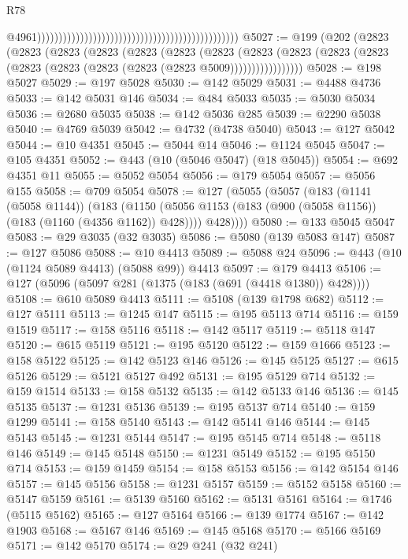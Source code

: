 \begin{lexlean}{R78}
\begin{coremodule}
                                                                                                  @4961)))))))))))))))))))))))))))))))))))))))))))))))
@5027 := @199
    (@202
      (@2823
        (@2823
          (@2823
            (@2823
              (@2823
                (@2823
                  (@2823
                    (@2823
                      (@2823 (@2823 (@2823 (@2823 (@2823 (@2823 (@2823 (@2823 @5009)))))))))))))))))
@5028 := @198 @5027
@5029 := @197 @5028
@5030 := @142 @5029
@5031 := @4488 @4736
@5033 := @142 @5031 @146
@5034 := @484 @5033
@5035 := @5030 @5034
@5036 := @2680 @5035
@5038 := @142 @5036 @285
@5039 := @2290 @5038
@5040 := @4769 @5039
@5042 := @4732 (@4738 @5040)
@5043 := @127 @5042
@5044 := @10 @4351
@5045 := @5044 @14
@5046 := @1124 @5045
@5047 := @105 @4351
@5052 := @443 (@10 (@5046 @5047) (@18 @5045))
@5054 := @692 @4351 @11
@5055 := @5052 @5054
@5056 := @179 @5054
@5057 := @5056 @155
@5058 := @709 @5054
@5078 := @127
    (@5055
      (@5057
        (@183
          (@1141 (@5058 @1144))
          (@183
            (@1150 (@5056 @1153 (@183 (@900 (@5058 @1156)) (@183 (@1160 (@4356 @1162)) @428))))
            @428))))
@5080 := @133 @5045 @5047
@5083 := @29 @3035 (@32 @3035)
@5086 := @5080 (@139 @5083 @147)
@5087 := @127 @5086
@5088 := @10 @4413
@5089 := @5088 @24
@5096 := @443 (@10 (@1124 @5089 @4413) (@5088 @99)) @4413
@5097 := @179 @4413
@5106 := @127 (@5096 (@5097 @281 (@1375 (@183 (@691 (@4418 @1380)) @428))))
@5108 := @610 @5089 @4413
@5111 := @5108 (@139 @1798 @682)
@5112 := @127 @5111
@5113 := @1245 @147
@5115 := @195 @5113 @714
@5116 := @159 @1519
@5117 := @158 @5116
@5118 := @142 @5117
@5119 := @5118 @147
@5120 := @615 @5119
@5121 := @195 @5120
@5122 := @159 @1666
@5123 := @158 @5122
@5125 := @142 @5123 @146
@5126 := @145 @5125
@5127 := @615 @5126
@5129 := @5121 @5127 @492
@5131 := @195 @5129 @714
@5132 := @159 @1514
@5133 := @158 @5132
@5135 := @142 @5133 @146
@5136 := @145 @5135
@5137 := @1231 @5136
@5139 := @195 @5137 @714
@5140 := @159 @1299
@5141 := @158 @5140
@5143 := @142 @5141 @146
@5144 := @145 @5143
@5145 := @1231 @5144
@5147 := @195 @5145 @714
@5148 := @5118 @146
@5149 := @145 @5148
@5150 := @1231 @5149
@5152 := @195 @5150 @714
@5153 := @159 @1459
@5154 := @158 @5153
@5156 := @142 @5154 @146
@5157 := @145 @5156
@5158 := @1231 @5157
@5159 := @5152 @5158
@5160 := @5147 @5159
@5161 := @5139 @5160
@5162 := @5131 @5161
@5164 := @1746 (@5115 @5162)
@5165 := @127 @5164
@5166 := @139 @1774
@5167 := @142 @1903
@5168 := @5167 @146
@5169 := @145 @5168
@5170 := @5166 @5169
@5171 := @142 @5170
@5174 := @29 @241 (@32 @241)

\end{coremodule}
\end{lexlean}
